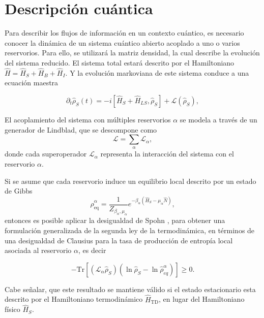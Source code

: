 \section{Descripción cuántica}
Para describir los flujos de información en un contexto cuántico, es necesario conocer la dinámica de un sistema cuántico abierto acoplado a uno o varios reservorios. Para ello, se utilizará la matriz densidad, la cual describe la evolución del sistema reducido. El sistema total estará descrito por el Hamiltoniano $\hat{H} = \hat{H}_{S} + \hat{H}_{B} + \hat{H}_{I}$. Y la evolución markoviana de este sistema conduce a una ecuación maestra

\begin{equation*}
    \partial_{t}\hat{\rho}_{S}(t) = - i[\hat{H}_{S} + \hat{H}_{LS},\hat{\rho}_{S}] + \mathcal{L}(\hat{\rho}_{S}),
\end{equation*}

El acoplamiento del sistema con múltiples reservorios $\alpha$ se modela a través de un generador de Lindblad, que se descompone como
\begin{equation*}
    \mathcal{L} = \sum_{\alpha} \mathcal{L}_{\alpha},
\end{equation*}
donde cada superoperador $\mathcal{L}_{\alpha}$ representa la interacción del sistema con el reservorio $\alpha$.

Si se asume que cada reservorio induce un equilibrio local descrito por un estado de Gibbs
\begin{equation*}
    \hat{\rho}_{\text{eq}}^{\alpha} = \frac{1}{Z_{\beta_\alpha, \mu_\alpha}} e^{-\beta_\alpha (\hat{H}_S - \mu_\alpha \hat{N})},
\end{equation*}
entonces es posible aplicar la desigualdad de Spohn \cite{spohn1978entropy}, para obtener una formulación generalizada de la segunda ley de la termodinámica, en términos de una desigualdad de Clausius para la tasa de producción de entropía local asociada al reservorio $\alpha$, es decir 

\begin{equation}
    - \text{Tr}[ (\mathcal{L}_{\alpha} \hat{\rho}_{S})(\ln \hat{\rho}_{S} - \ln \hat{\rho}^{\alpha}_{eq} )  ] \geq 0.
\label{spohninfo}
\end{equation}

Cabe señalar, que este resultado se mantiene válido si el estado estacionario esta descrito por el Hamiltoniano termodinámico $\hat{H}_{\mathrm{TD}}$, en lugar del Hamiltoniano físico $\hat{H}_S$.

